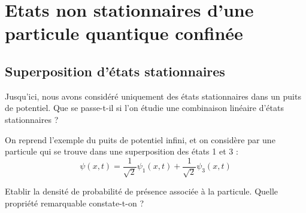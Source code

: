 \documentclass[11pt,fleqn]{book} %
\begin{document}
\section{Etats non stationnaires d'une particule quantique confinée}

\subsection{Superposition d'états stationnaires}

Jusqu'ici, nous avons considéré uniquement des états stationnaires dans un puits de potentiel. Que se passe-t-il si l'on étudie une combinaison linéaire d'états stationnaires ? 

On reprend l'exemple du puits de potentiel infini, et on considère par une particule qui se trouve dans une superposition des états 1 et 3 :
\begin{equation}
	\psi(x,t) = \frac{1}{\sqrt{2}} \psi_1(x,t) + \frac{1}{\sqrt{2}} \psi_3(x,t)
\end{equation}
\begin{capex}
	Etablir la densité de probabilité de présence associée à la particule. Quelle propriété remarquable constate-t-on ?
\end{capex}
\end{document}
